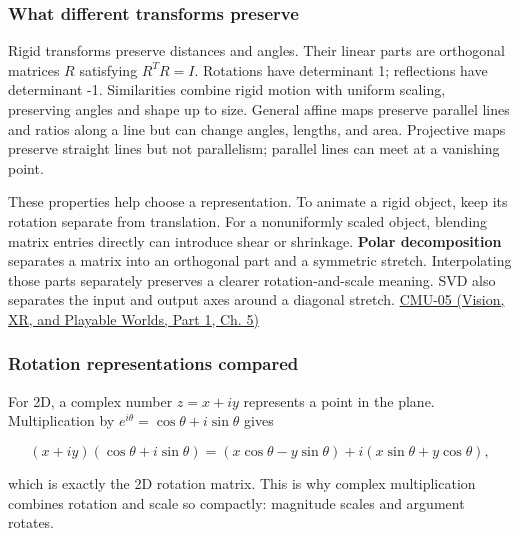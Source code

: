 \subsubsection{What different transforms preserve}\label{03-visual-computing-i-ch001-what-different-transforms-preserve}

\hypertarget{03-visual-computing-i-ch001-what-different-transforms-preserve}{}

Rigid transforms preserve distances and angles. Their linear parts are orthogonal matrices \(R\) satisfying \(R^TR=I\). Rotations have determinant 1; reflections have determinant -1. Similarities combine rigid motion with uniform scaling, preserving angles and shape up to size. General affine maps preserve parallel lines and ratios along a line but can change angles, lengths, and area. Projective maps preserve straight lines but not parallelism; parallel lines can meet at a vanishing point.

These properties help choose a representation. To animate a rigid object, keep its rotation separate from translation. For a nonuniformly scaled object, blending matrix entries directly can introduce shear or shrinkage. \textbf{Polar decomposition} separates a matrix into an orthogonal part and a symmetric stretch. Interpolating those parts separately preserves a clearer rotation-and-scale meaning. SVD also separates the input and output axes around a diagonal stretch. \href{../07-Vision-XR-and-Playable-Worlds-P01/main.pdf\#nameddest=04-visual-computing-ii-ch036-cmu-05---spatial-transformations}{CMU-05 (Vision, XR, and Playable Worlds, Part 1, Ch. 5)}

\subsubsection{Rotation representations compared}\label{03-visual-computing-i-ch001-rotation-representations-compared}

\hypertarget{03-visual-computing-i-ch001-rotation-representations-compared}{}

For 2D, a complex number \(z=x+iy\) represents a point in the plane. Multiplication by \(e^{i\theta}=\cos\theta+i\sin\theta\) gives

\[
(x+iy)(\cos\theta+i\sin\theta)=(x\cos\theta-y\sin\theta)+i(x\sin\theta+y\cos\theta),
\]

which is exactly the 2D rotation matrix. This is why complex multiplication combines rotation and scale so compactly: magnitude scales and argument rotates.

